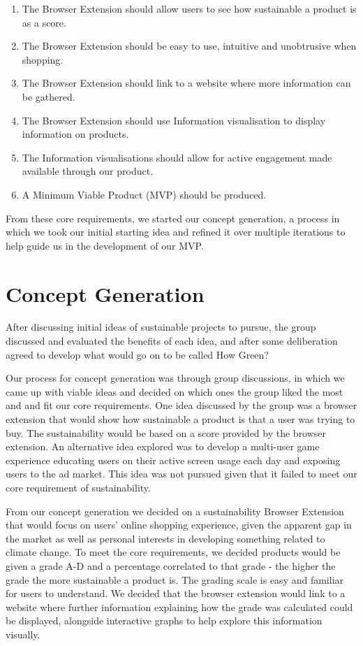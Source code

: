\documentclass[a4,10pt,twocolumn]{article}
\begin{document}
\begin{enumerate}
    \item The Browser Extension should allow users to see how sustainable a product is as a score.
    \item The Browser Extension should be easy to use, intuitive and unobtrusive when shopping.
    \item The Browser Extension should link to a website where more information can be gathered.
    \item The Browser Extension should use Information visualisation to display information on products.
    \item The Information visualisations should allow for active engagement made available through our product.
    \item A Minimum Viable Product (MVP) should be produced.
\end{enumerate}

From these core requirements, we started our concept generation, a process in which we took our initial starting idea and refined it over multiple iterations to help guide us in the development of our MVP.


\section*{Concept Generation}
After discussing initial ideas of sustainable projects to pursue, the group discussed and evaluated the benefits of each idea, and after some deliberation agreed to develop what would go on to be called How Green? 

Our process for concept generation was through group discussions, in which we came up with viable ideas and decided on which ones the group liked the most and and fit our core requirements. One idea discussed by the group was a browser extension that would show how sustainable a product is that a user was trying to buy. The sustainability would be based on a score provided by the browser extension. An alternative idea explored was to develop a multi-user game experience educating users on their active screen usage each day and exposing users to the ad market. This idea was not pursued given that it failed to meet our core requirement of sustainability.

From our concept generation we decided on a sustainability Browser Extension that would focus on users' online shopping experience, given the apparent gap in the market as well as personal interests in developing something related to climate change. To meet the core requirements, we decided products would be given a grade A-D and a percentage correlated to that grade - the higher the grade the more sustainable a product is. The grading scale is easy and familiar for users to understand. We decided that the browser extension would link to a website where further information explaining how the grade was calculated could be displayed, alongside interactive graphs to help explore this information visually.
\end{document}
